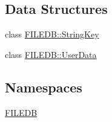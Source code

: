\subsection*{Data Structures}
\begin{DoxyCompactItemize}
\item 
class \mbox{\hyperlink{classFILEDB_1_1StringKey}{F\+I\+L\+E\+D\+B\+::\+String\+Key}}
\item 
class \mbox{\hyperlink{classFILEDB_1_1UserData}{F\+I\+L\+E\+D\+B\+::\+User\+Data}}
\end{DoxyCompactItemize}
\subsection*{Namespaces}
\begin{DoxyCompactItemize}
\item 
 \mbox{\hyperlink{namespaceFILEDB}{F\+I\+L\+E\+DB}}
\end{DoxyCompactItemize}

